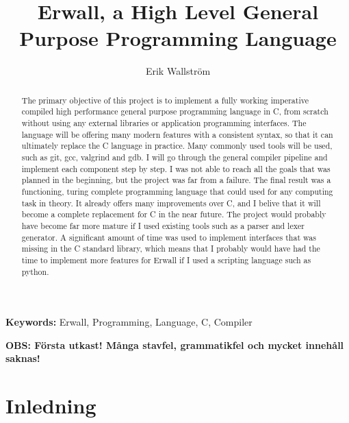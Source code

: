 \documentclass{theme}
\begin{document}
\title{Erwall, a High Level General Purpose Programming Language}
\subtitle{}
\author{Erik Wallström}
\maketitle
\newpage

\begin{abstract}
	The primary objective of this project is to implement a fully working 
	imperative compiled high performance general purpose programming language in
	C, from scratch without using any external libraries or application
	programming interfaces. The language will be offering many modern features
	with a consistent syntax, so that it can ultimately replace 
	the C language in practice. Many commonly used tools will be used, such as
	git, gcc, valgrind and gdb. I will go through the general compiler pipeline 
	and implement each component step by step. I was not able to reach all the 
	goals that was planned in the beginning, but the project was far 
	from a failure. The final result was a functioning, turing complete 
	programming language that could used for any computing task in theory. It 
	already offers many improvements over C, and I belive that it will become a
	complete replacement for C in the near future. The project would probably 
	have become far more mature if I used existing tools such as a parser and 
	lexer generator. A significant amount of time was used to implement 
	interfaces that was missing in the C standard library, which means that I
	probably would have had the time to implement more features for Erwall if
	I used a scripting language such as python. 
\end{abstract}

\begin{flushleft}
	{\small {\bf Keywords:} Erwall, Programming, Language, C, Compiler}
\end{flushleft}

\tableofcontents
{}
\newpage
{}

\noindent \large \textbf{OBS: Första utkast! Många stavfel, grammatikfel och 
mycket innehåll saknas!}\\
\section{Inledning}

\normalsize
\end{document}
